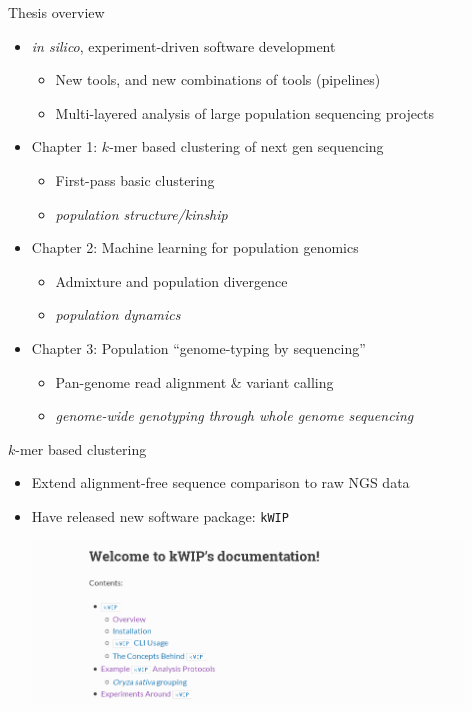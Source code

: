 \documentclass[t]{beamer}
\begin{document}
\begin{frame}{Thesis overview}
  \begin{itemize}
    \item \textit{in silico}, experiment-driven software development
      \begin{itemize}
        \item New tools, and new combinations of tools (pipelines)
        \item Multi-layered analysis of large population sequencing projects
      \end{itemize}
    \pause
    \item Chapter 1: $k$-mer based clustering of next gen sequencing
      \begin{itemize}
        \item First-pass basic clustering
        \item \textit{population structure/kinship}
      \end{itemize}
    \pause
    \item Chapter 2: Machine learning for population genomics
      \begin{itemize}
        \item Admixture and population divergence
        \item \textit{population dynamics}
      \end{itemize}
    \pause
    \item Chapter 3: Population ``genome-typing by sequencing''
      \begin{itemize}
        \item Pan-genome read alignment \& variant calling
        \item \textit{genome-wide genotyping through whole genome sequencing}
      \end{itemize}
  \end{itemize}
\end{frame}

\begin{frame}{$k$-mer based clustering}
  \begin{itemize}
    \item Extend alignment-free sequence comparison to raw NGS data
    \pause
    \item Have released new software package: \texttt{kWIP}
      \begin{center}
        \includegraphics[width=0.9\textwidth]{img/kwip-doc-screenshot.png}
      \end{center}
  \end{itemize}
\end{frame}
\end{document}
